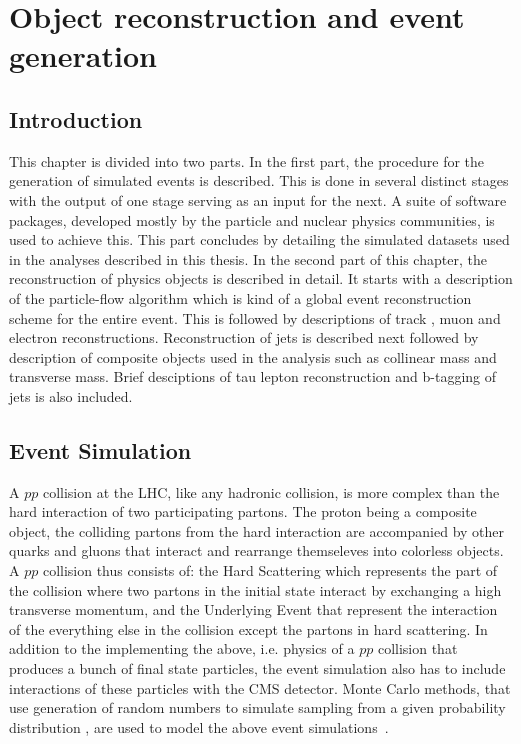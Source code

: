 
%
%

\chapter{Object reconstruction and event generation}
\label{chap:event_sim}
\section{Introduction}
\label{intro}
This chapter is divided into two parts. In the first part, the procedure for the generation of simulated events is described. This is done in several distinct stages with the output of one stage serving as an input for the next. A suite of software packages, developed mostly by the particle and nuclear physics communities, is used to achieve this. This part concludes by detailing the simulated datasets used in the analyses described in this thesis. In the second part of this chapter, the reconstruction of physics objects is described in detail. It starts with a description of the particle-flow algorithm which is kind of a global event reconstruction scheme for the entire event. This is followed by descriptions of track , muon and electron reconstructions. Reconstruction of jets is described next followed by description of composite objects used in the analysis such as collinear mass and transverse mass. Brief desciptions of tau lepton reconstruction and b-tagging of jets is also included.


\section{Event Simulation}
A $pp$ collision at the LHC, like any hadronic collision, is more complex than the hard interaction of two participating partons. The proton being a composite object, the colliding partons from the hard interaction are accompanied by other quarks and gluons that interact and rearrange themseleves into colorless objects. A $pp$ collision thus consists of: the Hard Scattering which represents the part of the collision where two partons in the initial state interact by exchanging a high transverse momentum, and the Underlying Event that represent the interaction of the everything else in the collision except the partons in hard scattering. In addition to the implementing the above, i.e. physics of a $pp$ collision  that produces a bunch of final state particles, the event simulation also has to include interactions of these particles with the CMS detector. Monte Carlo methods, that use generation of random numbers to simulate sampling from a given probability distribution , are used to model the above event simulations~\cite{mc_evtsim}.

